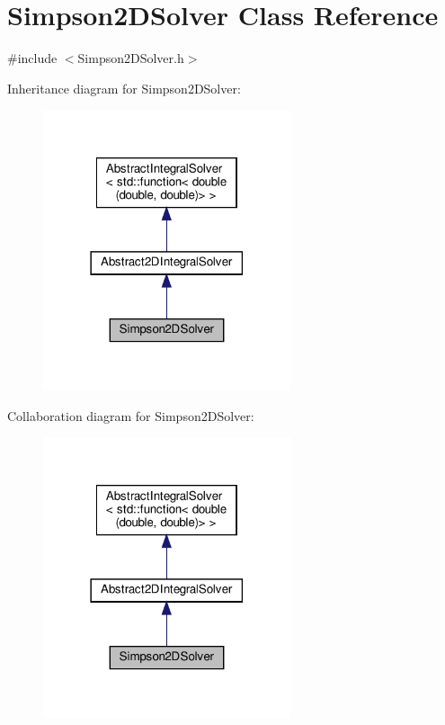 \hypertarget{class_simpson2_d_solver}{}\section{Simpson2\+D\+Solver Class Reference}
\label{class_simpson2_d_solver}


{\ttfamily \#include $<$Simpson2\+D\+Solver.\+h$>$}



Inheritance diagram for Simpson2\+D\+Solver\+:
\nopagebreak
\begin{figure}[H]
\begin{center}
\leavevmode
\includegraphics[width=206pt]{class_simpson2_d_solver__inherit__graph}
\end{center}
\end{figure}


Collaboration diagram for Simpson2\+D\+Solver\+:
\nopagebreak
\begin{figure}[H]
\begin{center}
\leavevmode
\includegraphics[width=206pt]{class_simpson2_d_solver__coll__graph}
\end{center}
\end{figure}

